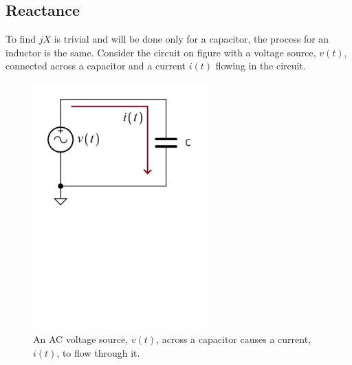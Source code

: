 \subsection{Reactance} \label{subsec:Reactance}
To find $jX$ is trivial and will be done only for a capacitor, the process for an inductor is the same. Consider the circuit on figure  with a voltage source, $v(t)$, connected across a capacitor and a current $i(t)$ flowing in the circuit. 
\begin{figure}[H]
    \centering
    \includegraphics[clip, trim=0 400 0 0, width=0.60\textwidth]{Sections/4_TechnicalAnalysis/Figures/4_1_1_CapCircuit.pdf}
    \caption{An AC voltage source, $v(t)$, across a capacitor causes a current, $i(t)$, to flow through it.}
    \label{fig:4_1_1_CapCircuit}
\end{figure}

